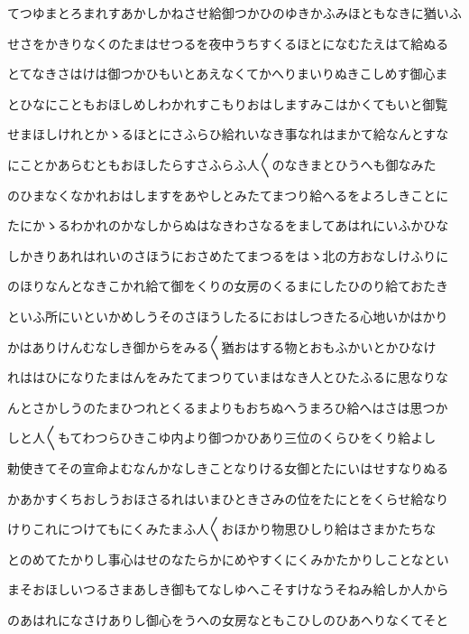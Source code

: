 \documentclass[a4paper,11pt,landscape]{ltjtarticle}
\begin{document}
\par\medskip
てつゆまとろまれすあかしかねさせ給御つかひのゆきかふみほともなきに猶いふ
\par\medskip
せさをかきりなくのたまはせつるを夜中うちすくるほとになむたえはて給ぬる
\par\medskip
とてなきさはけは御つかひもいとあえなくてかへりまいりぬきこしめす御心ま
\par\medskip
とひなにこともおほしめしわかれすこもりおはしますみこはかくてもいと御覧
\par\medskip
せまほしけれとかゝるほとにさふらひ給れいなき事なれはまかて給なんとすな
\par\medskip
にことかあらむともおほしたらすさふらふ人〱のなきまとひうへも御なみた
\par\medskip
のひまなくなかれおはしますをあやしとみたてまつり給へるをよろしきことに
\par\medskip
たにかゝるわかれのかなしからぬはなきわさなるをましてあはれにいふかひな
\par\medskip
しかきりあれはれいのさほうにおさめたてまつるをはゝ北の方おなしけふりに
\par\medskip
のほりなんとなきこかれ給て御をくりの女房のくるまにしたひのり給ておたき
\par\medskip
といふ所にいといかめしうそのさほうしたるにおはしつきたる心地いかはかり
\par\medskip
かはありけんむなしき御からをみる〱猶おはする物とおもふかいとかひなけ
\par\medskip
れははひになりたまはんをみたてまつりていまはなき人とひたふるに思なりな
\par\medskip
んとさかしうのたまひつれとくるまよりもおちぬへうまろひ給へはさは思つか
\par\medskip
しと人〱もてわつらひきこゆ内より御つかひあり三位のくらひをくり給よし
\par\medskip
勅使きてその宣命よむなんかなしきことなりける女御とたにいはせすなりぬる
\par\medskip
かあかすくちおしうおほさるれはいまひときさみの位をたにとをくらせ給なり
\par\medskip
けりこれにつけてもにくみたまふ人〱おほかり物思ひしり給はさまかたちな
\par\medskip
とのめてたかりし事心はせのなたらかにめやすくにくみかたかりしことなとい
\par\medskip
まそおほしいつるさまあしき御もてなしゆへこそすけなうそねみ給しか人から
\par\medskip
のあはれになさけありし御心をうへの女房なともこひしのひあへりなくてそと
\par\medskip
\end{document}
